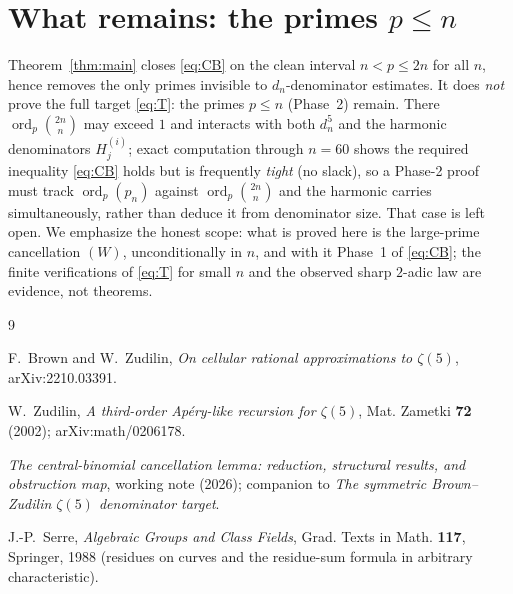 \documentclass[11pt]{article}
\theoremstyle{definition}
\DeclareMathOperator{\ord}{ord}
\newcommand{\bin}[2]{\binom{#1}{#2}}
\begin{document}
\section{What remains: the primes $p\le n$}\label{sec:phase2}

Theorem~\ref{thm:main} closes \eqref{eq:CB} on the clean interval $n<p\le2n$ for
all $n$, hence removes the only primes invisible to $d_n$-denominator estimates.
It does \emph{not} prove the full target \eqref{eq:T}: the primes $p\le n$
(Phase~2) remain. There $\ord_p\bin{2n}{n}$ may exceed $1$ and interacts with
both $d_n^5$ and the harmonic denominators $H_j^{(i)}$; exact computation
through $n=60$ shows the required inequality \eqref{eq:CB} holds but is
frequently \emph{tight} (no slack), so a Phase-2 proof must track
$\ord_p(p_n)$ against $\ord_p\bin{2n}{n}$ and the harmonic carries
simultaneously, rather than deduce it from denominator size. That case is left
open. We emphasize the honest scope: what is proved here is the large-prime
cancellation $(W)$, unconditionally in $n$, and with it Phase~1 of \eqref{eq:CB};
the finite verifications of \eqref{eq:T} for small $n$ and the observed sharp
$2$-adic law are evidence, not theorems.

\begin{thebibliography}{9}

F.~Brown and W.~Zudilin,
\emph{On cellular rational approximations to $\zeta(5)$},
arXiv:2210.03391.

W.~Zudilin,
\emph{A third-order Ap\'ery-like recursion for $\zeta(5)$},
Mat. Zametki \textbf{72} (2002); arXiv:math/0206178.

\emph{The central-binomial cancellation lemma: reduction, structural results,
and obstruction map}, working note (2026); companion to
\emph{The symmetric Brown--Zudilin $\zeta(5)$ denominator target}.

J.-P.~Serre,
\emph{Algebraic Groups and Class Fields},
Grad. Texts in Math. \textbf{117}, Springer, 1988 (residues on curves and the
residue-sum formula in arbitrary characteristic).

\end{thebibliography}
\end{document}
